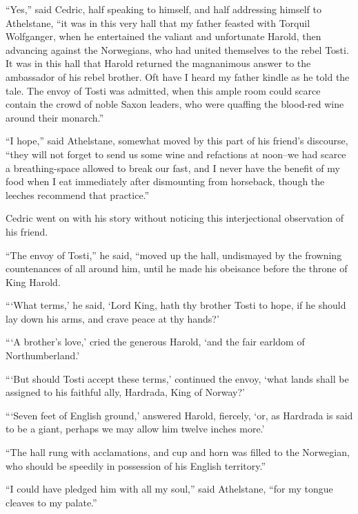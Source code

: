 ``Yes,'' said Cedric, half speaking to himself, and half addressing
himself to Athelstane, ``it was in this very hall that my father feasted
with Torquil Wolfganger, when he entertained the valiant and unfortunate
Harold, then advancing against the Norwegians, who had united themselves
to the rebel Tosti. It was in this hall that Harold returned the
magnanimous answer to the ambassador of his rebel brother. Oft have I
heard my father kindle as he told the tale. The envoy of Tosti was
admitted, when this ample room could scarce contain the crowd of noble
Saxon leaders, who were quaffing the blood-red wine around their
monarch.''

``I hope,'' said Athelstane, somewhat moved by this part of his friend's
discourse, ``they will not forget to send us some wine and refactions at
noon--we had scarce a breathing-space allowed to break our fast, and I
never have the benefit of my food when I eat immediately after
dismounting from horseback, though the leeches recommend that
practice.''

Cedric went on with his story without noticing this interjectional
observation of his friend.

``The envoy of Tosti,'' he said, ``moved up the hall, undismayed by the
frowning countenances of all around him, until he made his obeisance
before the throne of King Harold.

```What terms,' he said, `Lord King, hath thy brother Tosti to hope, if
he should lay down his arms, and crave peace at thy hands?'

```A brother's love,' cried the generous Harold, `and the fair earldom
of Northumberland.'

```But should Tosti accept these terms,' continued the envoy, `what
lands shall be assigned to his faithful ally, Hardrada, King of Norway?'

```Seven feet of English ground,' answered Harold, fiercely, `or, as
Hardrada is said to be a giant, perhaps we may allow him twelve inches
more.'

``The hall rung with acclamations, and cup and horn was filled to the
Norwegian, who should be speedily in possession of his English
territory.''

``I could have pledged him with all my soul,'' said Athelstane, ``for my
tongue cleaves to my palate.''

